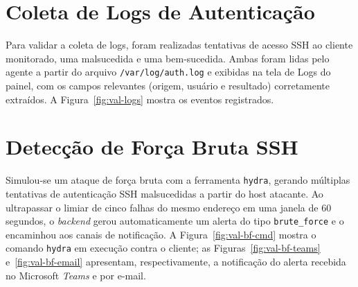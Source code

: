 \documentclass[
    12pt
    ,oneside
    ,a4paper
    ,chapter=TITLE
    ,section=TITLE
    ,sumario=abnt-6027-2012]{abntex2}
\begin{document}
\begin{figure}[H]
\end{figure}

\begin{figure}[H]
\end{figure}

\section{Coleta de Logs de Autenticação}
\label{sec:valid-logs}

Para validar a coleta de logs, foram realizadas tentativas de acesso SSH ao cliente monitorado, uma malsucedida e uma bem-sucedida. Ambas foram lidas pelo agente a partir do arquivo \texttt{/var/log/auth.log} e exibidas na tela de Logs do painel, com os campos relevantes (origem, usuário e resultado) corretamente extraídos. A Figura~\ref{fig:val-logs} mostra os eventos registrados.

\begin{figure}[H]
\end{figure}

\section{Detecção de Força Bruta SSH}
\label{sec:valid-bruteforce}

Simulou-se um ataque de força bruta com a ferramenta \texttt{hydra}, gerando múltiplas tentativas de autenticação SSH malsucedidas a partir do host atacante. Ao ultrapassar o limiar de cinco falhas do mesmo endereço em uma janela de 60 segundos, o \textit{backend} gerou automaticamente um alerta do tipo \texttt{brute\_force} e o encaminhou aos canais de notificação. A Figura~\ref{fig:val-bf-cmd} mostra o comando \texttt{hydra} em execução contra o cliente; as Figuras~\ref{fig:val-bf-teams} e~\ref{fig:val-bf-email} apresentam, respectivamente, a notificação do alerta recebida no Microsoft \textit{Teams} e por e-mail.

\begin{figure}[H]
\end{figure}
\end{document}
